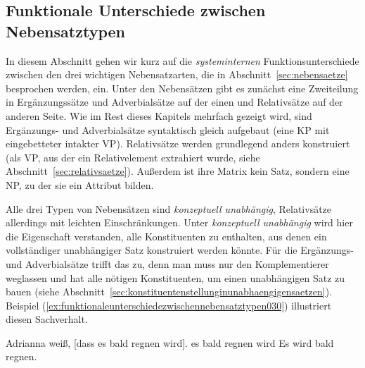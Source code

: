 \subsection{Funktionale Unterschiede zwischen Nebensatztypen}
\label{sec:funktionaleunterschiedezwischennebensatztypen}

In diesem Abschnitt gehen wir kurz auf die \textit{systeminternen} Funktionsunterschiede zwischen den drei wichtigen Nebensatzarten, die in Abschnitt~\ref{sec:nebensaetze} besprochen werden, ein.
Unter den Nebensätzen gibt es zunächst eine Zweiteilung in Ergänzungssätze und Adverbialsätze auf der einen und Relativsätze auf der anderen Seite.
Wie im Rest dieses Kapitels mehrfach gezeigt wird, sind Ergänzungs- und Adverbialsätze syntaktisch gleich aufgebaut (eine KP mit eingebetteter intakter VP).
Relativsätze werden grundlegend anders konstruiert (als VP, aus der ein Relativelement extrahiert wurde, siehe Abschnitt~\ref{sec:relativsaetze}).
Außerdem ist ihre Matrix kein Satz, sondern eine NP, zu der sie ein Attribut bilden.


Alle drei Typen von Nebensätzen sind \textit{konzeptuell unabhängig}, Relativsätze allerdings mit leichten Einschränkungen.
Unter \textit{konzeptuell unabhängig} wird hier die Eigenschaft verstanden, alle Konstituenten zu enthalten, aus denen ein vollständiger unabhängiger Satz konstruiert werden könnte.
Für die Ergänzungs- und Adverbialsätze trifft das zu, denn man muss nur den Komplementierer weglassen und hat alle nötigen Konstituenten, um einen unabhängigen Satz zu bauen (siehe Abschnitt~\ref{sec:konstituentenstellunginunabhaengigensaetzen}).
Beispiel (\ref{ex:funktionaleunterschiedezwischennebensatztypen030}) illustriert diesen Sachverhalt.

\begin{exe}
  \ex\label{ex:funktionaleunterschiedezwischennebensatztypen030}
  \begin{xlist}
    \ex\label{ex:funktionaleunterschiedezwischennebensatztypen031} Adrianna weiß, [dass es bald regnen wird].
    \ex\label{ex:funktionaleunterschiedezwischennebensatztypen032} es bald regnen wird
    \ex\label{ex:funktionaleunterschiedezwischennebensatztypen033} Es wird bald regnen.
  \end{xlist}
\end{exe}

